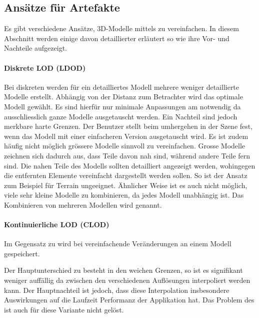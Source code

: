 \subsection{Ansätze für  Artefakte}
\label{chap:differentLodApproaches}
Es gibt verschiedene Ansätze, 3D-Modelle mittels  zu vereinfachen. In diesem Abschnitt werden einige davon detaillierter erläutert so wie ihre Vor- und Nachteile aufgezeigt.

\paragraph{Diskrete LOD (LDOD)}
Bei diskreten  werden für ein detailliertes Modell mehrere weniger detaillierte Modelle erstellt.
Abhängig von der Distanz zum Betrachter wird das optimale Modell gewählt. Es sind hierfür nur minimale Anpassungen am  notwendig da ausschliesslich ganze Modelle ausgetauscht werden.
Ein Nachteil sind jedoch merkbare harte Grenzen. Der Benutzer stellt beim umhergehen in der Szene fest, wenn das Modell mit einer einfacheren Version ausgetauscht wird.
Es ist zudem häufig nicht möglich grössere Modelle sinnvoll zu vereinfachen. Grosse Modelle zeichnen sich dadurch aus, dass Teile davon nah sind, während andere Teile fern sind. Die nahen Teile des Modells sollten detailliert angezeigt werden, wohingegen die entfernten Elemente vereinfacht dargestellt werden sollen. So ist der Ansatz zum Beispiel für Terrain ungeeignet. Ähnlicher Weise ist es auch nicht möglich, viele sehr kleine Modelle zu kombinieren, da jedes Modell unabhängig ist. Das Kombinieren von mehreren Modellen wird  genannt.

\paragraph{Kontinuierliche LOD (CLOD)}
Im Gegensatz zu  wird bei  vereinfachende Veränderungen an einem Modell gespeichert.

Der Hauptunterschied zu  besteht in den weichen Grenzen, so ist es signifikant weniger auffällig da zwischen den verschiedenen Auflösungen interpoliert werden kann.
Der Hauptnachteil ist jedoch, dass diese Interpolation insbesondere Auswirkungen auf die Laufzeit Performanz der Applikation hat.
Das Problem des  ist auch für diese Variante nicht gelöst.

